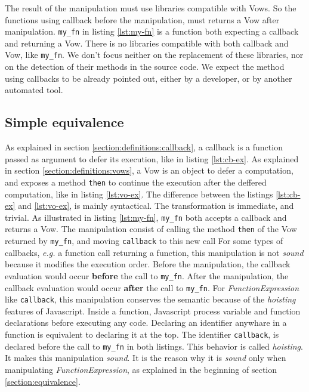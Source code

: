 The result of the manipulation must use libraries compatible with Vows.
So the functions using callback before the manipulation, must returns a Vow after manipulation.
\texttt{my_fn} in listing \ref{lst:my-fn} is a function both expecting a callback and returning a Vow.
There is no libraries compatible with both callback and Vow, like \texttt{my_fn}.
We don't focus neither on the replacement of these libraries, nor on the detection of their methods in the source code.
We expect the method using callbacks to be already pointed out, either by a developer, or by another automated tool.


\subsection{Simple equivalence} \label{section:equivalences:general}

As explained in section \ref{section:definitions:callback}, a callback is a function passed as argument to defer its execution, like in listing \ref{lst:cb-ex}.
As explained in section \ref{section:definitions:vows}, a Vow is an object to defer a computation, and exposes a method \texttt{then} to continue the execution after the deffered computation, like in listing \ref{lst:vo-ex}.
The difference between the listings \ref{lst:cb-ex} and \ref{lst:vo-ex}, is mainly syntactical.
The transformation is immediate, and trivial.
As illustrated in listing \ref{lst:my-fn}, \texttt{my_fn} both accepts a callback and returns a Vow.
The manipulation consist of calling the method \texttt{then} of the Vow returned by \texttt{my_fn}, and moving \texttt{callback} to this new call
For some types of callbacks, \textit{e.g.} a function call returning a function, this manipulation is not \textit{sound} because it modifies the execution order.
Before the manipulation, the callback evaluation would occur \textbf{before} the call to \texttt{my_fn}.
After the manipulation, the callback evaluation would occur \textbf{after} the call to \texttt{my_fn}.
For \textit{FunctionExpression} like \texttt{callback}, this manipulation conserves the semantic because of the \textit{hoisting} features of Javascript.
Inside a function, Javascript process variable and function declarations before executing any code.
Declaring an identifier anywhare in a function is equivalent to declaring it at the top.
The identifier \texttt{callback}, is declared before the call to \texttt{my_fn} in both listings.
This behavior is called \textit{hoisting}.
It makes this manipulation \textit{sound}.
It is the reason why it is \textit{sound} only when manipulating \textit{FunctionExpression}, as explained in the beginning of section \ref{section:equivalence}.


